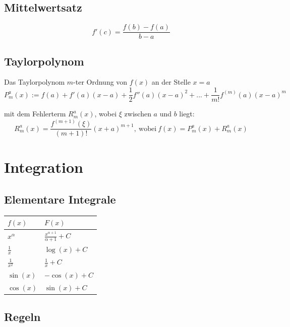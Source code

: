 \documentclass[11pt]{article}
\begin{document}
\subsection{Mittelwertsatz}

\begin{equation*}
	f'(c) = \frac{f(b) - f(a)}{b - a}
\end{equation*}

\subsection{Taylorpolynom}

Das Taylorpolynom $m$-ter Ordnung von $f(x)$ an der Stelle $x=a$
\begin{equation*}
	P^a_m(x) := f(a) + f'(a)(x-a) + \frac{1}{2}f''(a)(x-a)^2 + ... + \frac{1}{m!} f^{(m)}(a)(x-a)^m
\end{equation*}

mit dem Fehlerterm $R^a_m(x)$, wobei $\xi$ zwischen $a$ und $b$ liegt:
\begin{equation*}
	R^a_m(x) = \frac{f^{(m+1)}(\xi)}{(m+1)!}(x+a)^{m+1},\ \text{wobei}\ f(x) = P^a_m(x) + R^a_m(x)
\end{equation*}

\section{Integration}

\subsection{Elementare Integrale}

\begin{table}[H]
\centering
\begin{tabular}{|l|l|}
\hline
$f(x)$ & $F(x)$ \\ \hline
$x^\alpha$ & $\frac{x^{\alpha+1}}{\alpha+1} + C$ \\ \hline
$\frac{1}{x}$ & $\log (x) + C$ \\ \hline
$\frac{1}{x^2}$ & $\frac{1}{x} + C$ \\ \hline
$\sin(x)$ & $-\cos(x) + C$ \\ \hline
$\cos(x)$ & $\sin(x) + C$ \\ \hline
\end{tabular}
\end{table}

\subsection{Regeln}
\end{document}
